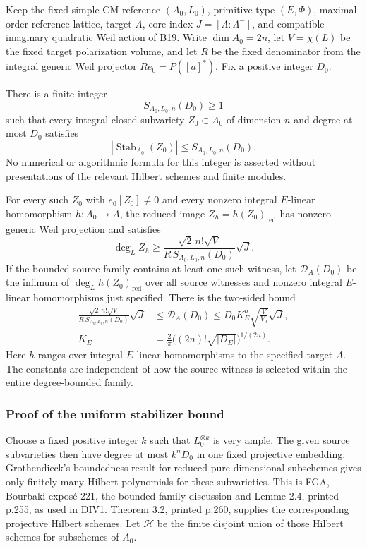 \documentclass[11pt,a4paper]{article}
\theoremstyle{definition}
\begin{document}
Keep the fixed simple CM reference \((A_0,L_0)\), primitive type \((E,\Phi)\), maximal-order reference lattice, target \(A\), core index \(J=[\Lambda:\Lambda^-]\), and compatible imaginary quadratic Weil action of B19. Write \(\dim A_0=2n\), let \(V=\chi(L)\) be the fixed target polarization volume, and let \(R\) be the fixed denominator from the integral generic Weil projector \(Re_0=P([a]^*)\). Fix a positive integer \(D_0\).

There is a finite integer \[
 S_{A_0,L_0,n}(D_0)\ge1
\] such that every integral closed subvariety \(Z_0\subset A_0\) of dimension \(n\) and degree at most \(D_0\) satisfies \[
 |\operatorname{Stab}_{A_0}(Z_0)|\le S_{A_0,L_0,n}(D_0).
\tag{B21.1}
\] No numerical or algorithmic formula for this integer is asserted without presentations of the relevant Hilbert schemes and finite modules.

For every such \(Z_0\) with \(e_0[Z_0]\ne0\) and every nonzero integral \(E\)-linear homomorphism \(h:A_0\to A\), the reduced image \(Z_h=h(Z_0)_{\mathrm{red}}\) has nonzero generic Weil projection and satisfies \[
 \deg_L Z_h
 \ge
 \frac{\sqrt2\,n!\sqrt V}
      {R\,S_{A_0,L_0,n}(D_0)}\sqrt J.
\tag{B21.2}
\] If the bounded source family contains at least one such witness, let \(\mathcal D_A(D_0)\) be the infimum of \(\deg_L h(Z_0)_{\mathrm{red}}\) over all source witnesses and nonzero integral \(E\)-linear homomorphisms just specified. There is the two-sided bound \[
 \begin{aligned}
 \frac{\sqrt2\,n!\sqrt V}
      {R\,S_{A_0,L_0,n}(D_0)}\sqrt J
 &\le \mathcal D_A(D_0)
 \le D_0K_E^n\sqrt{\frac{V}{V_0}}\sqrt J,\\
 K_E&=\frac2\pi\bigl((2n)!\sqrt{|D_E|}\bigr)^{1/(2n)}.
 \end{aligned}
\tag{B21.3}
\] Here \(h\) ranges over integral \(E\)-linear homomorphisms to the specified target \(A\). The constants are independent of how the source witness is selected within the entire degree-bounded family.

\subsubsection{Proof of the uniform stabilizer bound}\label{proof-of-the-uniform-stabilizer-bound}

Choose a fixed positive integer \(k\) such that \(L_0^{\otimes k}\) is very ample. The given source subvarieties then have degree at most \(k^nD_0\) in one fixed projective embedding. Grothendieck's boundedness result for reduced pure-dimensional subschemes gives only finitely many Hilbert polynomials for these subvarieties. This is FGA, Bourbaki exposé 221, the bounded-family discussion and Lemme 2.4, printed p.255, as used in DIV1. Theorem 3.2, printed p.260, supplies the corresponding projective Hilbert schemes. Let \(\mathcal H\) be the finite disjoint union of those Hilbert schemes for subschemes of \(A_0\).
\end{document}

